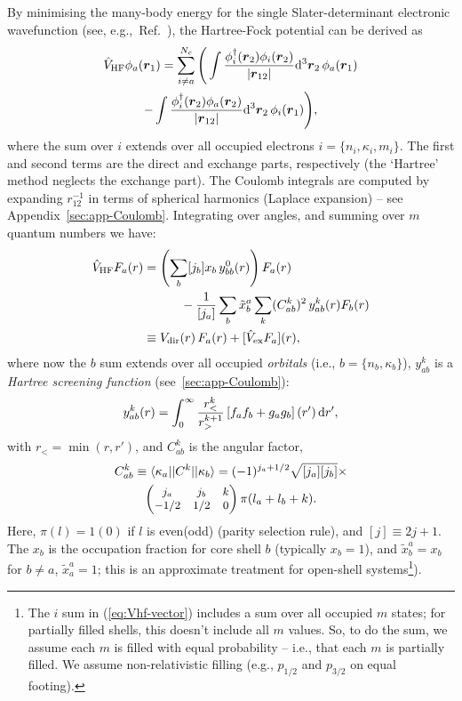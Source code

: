 \documentclass[10pt,twocolumn,a4paper]{article}%
\newcommand{\bra}[1]{\ensuremath{\langle #1|}}	%
\newcommand{\ket}[1]{\ensuremath{|#1\rangle}}	%
\newcommand{\threej}[6]{\small\ensuremath{\begin{pmatrix}#1&#2&#3\\#4&#5&#6\end{pmatrix}}}	%
\renewcommand{\v}[1]{\ensuremath{\boldsymbol{#1}}}		%
\newcommand{\be}{\begin{equation}}
\newcommand{\ee}{\end{equation}}
\def\d{\ensuremath{{\rm d}}}
\renewcommand{\k}{\ensuremath{\kappa}}
\begin{document}
By minimising the many-body energy for the single Slater-determinant electronic wavefunction (see, e.g.,~Ref.~\cite{JohnsonBook2007}), the Hartree-Fock potential can be derived as
\begin{multline}\label{eq:Vhf-vector}
\hat V_{\rm HF}\phi_a(\v{r}_1) = \sum_{i\neq a}^{N_c}\Bigg(
\int \frac{\phi_i^\dag(\v{r}_2)\phi_i(\v{r}_2)}{|\v{r}_{12}|}\d^3\v{r}_2\,\phi_a(\v{r}_1)\\
-\int \frac{\phi_i^\dag(\v{r}_2)\phi_a(\v{r}_2)}{|\v{r}_{12}|}\d^3\v{r}_2\,\phi_i(\v{r}_1)
\Bigg),
\end{multline}
where the sum over $i$ extends over all occupied electrons $i=\{n_i,\k_i,m_i\}$.
The first and second terms are the direct and exchange parts, respectively (the `Hartree' method neglects the exchange part).
The Coulomb integrals are computed by expanding ${r}_{12}^{-1}$ in terms of spherical harmonics (Laplace expansion) -- see Appendix~\ref{sec:app-Coulomb}.
Integrating over angles, and summing over $m$ quantum numbers we have:
\begin{align}
\label{eq:Vhf-radial}
\hat V_{\rm HF}F_a(r)& = \left(\sum_b [j_b] x_b  \,  y^0_{bb}(r)\right)F_a(r)
\notag \\  & \qquad\quad
-\frac{1}{[j_a]}\sum_b \tilde x_b^{a}\sum_k (C^k_{ab})^2\, y^k_{ab}(r) F_b(r)  \\
\label{eq:Vhf}
&\equiv V_{\rm dir}(r)\,F_a(r) + [\hat V_{\rm ex}F_a](r),
\end{align}
where now the $b$ sum extends over all occupied {\em orbitals} (i.e., $b=\{n_b,\k_b\}$),
$y_{ab}^k$ is a {\sl Hartree screening function} (see~\ref{sec:app-Coulomb}):
%
\be\label{eq:ykab}
y^k_{ab}(r) = \int_0^\infty \frac{r_<^k}{r_>^{k+1}}\left[f_a f_b + g_a g_b\right](r')\, \d r',
\ee
with $r_{<} = \min(r,r')$, and
$C^k_{ab}$ is the angular factor,
%
\begin{multline}\label{eq:Ckab}
C^k_{ab}\equiv\bra{\k_a}|C^k|\ket{\k_b} = (-1)^{j_a+1/2}\sqrt{[j_a][j_b]}\times\\\threej{j_a}{j_b}{k}{-1/2}{1/2}{0}\pi(l_a+l_b+k).
\end{multline}
Here, $\pi(l)=1(0)$ if $l$ is even(odd) (parity selection rule), and $[j]\equiv2j+1$. 
The $x_b$ is the occupation fraction for core shell $b$ (typically $x_b=1$), and
$\tilde x^a_b = x_b$ for $b\neq a$,  $\tilde x^a_a = 1$; this is an approximate treatment for open-shell systems\footnote{The $i$ sum in (\ref{eq:Vhf-vector}) includes a sum over all occupied $m$ states; for partially filled shells, this doesn't include all $m$ values. So, to do the sum, we assume each $m$ is filled with equal probability -- i.e., that each $m$ is partially filled. We assume non-relativistic filling (e.g., $p_{1/2}$ and $p_{3/2}$ on equal footing).}).
\end{document}
